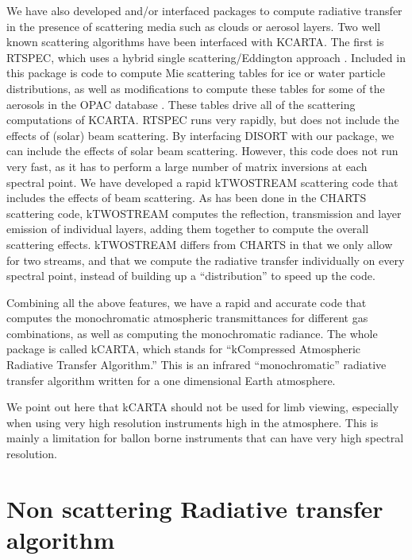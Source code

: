 \documentclass[11pt]{article}
\begin{document}
We have also developed and/or interfaced packages to compute radiative 
transfer in the presence of scattering media such as clouds or aerosol layers.
Two well known scattering  algorithms have been interfaced with 
\textsf{KCARTA}. The first is \textsf{RTSPEC}, which uses a hybrid single 
scattering/Eddington approach \cite{dee:98}. Included in this package is 
code to compute Mie scattering tables for ice or water particle distributions,
as well as modifications to compute these tables for some of the aerosols in 
the \textsf{OPAC} database \cite{hes:98}. These tables drive all of the 
scattering computations of \textsf{KCARTA}. \textsf{RTSPEC} runs very rapidly,
but does not include the effects of (solar) beam scattering. By interfacing 
\textsf{DISORT} \cite{stam:88} with our package, we can include the effects of
solar beam scattering. However, this code does not run very fast, as it has to
perform a large number of matrix inversions at each spectral point. We have 
developed a rapid \textsf{kTWOSTREAM} scattering code that includes the 
effects of beam scattering. As has been done in the \textsf{CHARTS} 
\cite{mon:97} scattering code, \textsf{kTWOSTREAM} computes the reflection, 
transmission and layer emission of individual layers, adding them together to 
compute the overall scattering effects. \textsf{kTWOSTREAM} differs from 
\textsf{CHARTS} in that we only allow for two streams, and that we compute 
the radiative transfer individually on every spectral point, instead of 
building up a ``distribution'' to speed up the code.

Combining all the above features, we have a rapid and accurate code that 
computes the 
monochromatic atmospheric transmittances for different gas combinations, as
well as computing the monochromatic radiance. The whole package is called 
\textsf{kCARTA}, which stands for ``kCompressed Atmospheric Radiative 
Transfer Algorithm.''  This is an infrared ``monochromatic'' radiative 
transfer algorithm written for a one dimensional Earth atmosphere. 

We point out here that \textsf{kCARTA} should not be used for limb viewing, 
especially when using very high resolution instruments high in the
atmosphere. This is mainly a limitation for ballon borne instruments that can 
have very high spectral resolution.

\section{Non scattering Radiative transfer algorithm}
\end{document}
